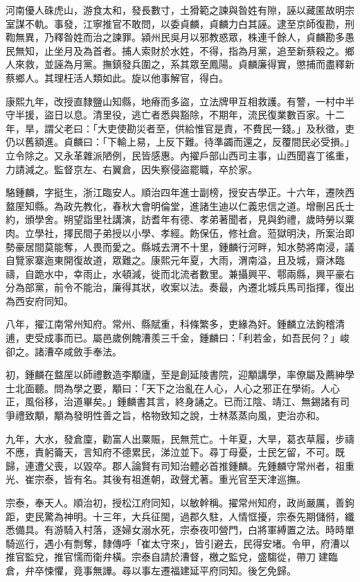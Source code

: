 \begin{pinyinscope}
河南優人硃虎山，游食太和，發長數寸，土猾範之諫與昝姓有隙，誣以藏匿故明宗室謀不軌。事發，江寧推官不敢問，以委貞麟，貞麟力白其誣。逮至京師復勘，刑鞫無異，乃釋昝姓而治之諫罪。潁州民吳月以邪教惑眾，株連千餘人，貞麟勘多愚民無知，止坐月及為首者。捕人索財於水姓，不得，指為月黨，追至新蔡殺之。鄉人來救，並誣為月黨。撫鎮發兵圍之，系其眾至鳳陽。貞麟廉得實，懲捕而盡釋新蔡鄉人。其理枉活人類如此。旋以他事解官，得白。

康熙九年，改授直隸鹽山知縣，地瘠而多盜，立法牌甲互相救護。有警，一村中半守半援，盜日以息。清里役，逃亡者悉與豁除，不期年，流民復業數百家。十二年，旱，謂父老曰：「大吏使勘災者至，供給惟官是責，不費民一錢。」及秋徵，吏仍以舊額進。貞麟曰：「下輸上易，上反下難。待準蠲而還之，反覆間民必受損。」立令除之。又永革雜派陋例，民皆感惠。內擢戶部山西司主事，山西聞喜丁徭重，力請減之。監督京左、右翼倉，因失察侵盜罷職，卒於家。

駱鍾麟，字挺生，浙江臨安人。順治四年進士副榜，授安吉學正。十六年，遷陜西盩厔知縣。為政先教化，春秋大會明倫堂，進諸生迪以仁義忠信之道。增刪呂氏士約，頒學舍。朔望詣里社講演，訪耆年有德、孝弟著聞者，見與鈞禮，歲時勞以粟肉。立學社，擇民間子弟授以小學、孝經。飭保伍，修社倉。蒞獄明決，所案治即勢豪居間莫能奪，人畏而愛之。縣城去渭不十里，鍾麟行河畔，知水勢將南浸，議自覽家寨迤東開復故道，眾難之。康熙元年夏，大雨，渭南溢，且及城，齋沐臨禱，自跪水中，幸雨止，水頓減，徙而北流者數里。兼攝興平、鄠兩縣，興平豪右分為部黨，前令不能治，廉得其狀，收案以法。奏最，內遷北城兵馬司指揮，復出為西安府同知。

八年，擢江南常州知府。常州、縣賦重，科條繁多，吏緣為奸。鍾麟立法鉤稽清逋，吏受成事而已。屬邑歲例餽漕羨三千金，鍾麟曰：「利若金，如吾民何？」峻卻之。諸漕卒咸斂手奉法。

初，鍾麟在盩厔以師禮數造李顒廬，至是創延陵書院，迎顒講學，率僚屬及薦紳學士北面聽。問為學之要，顒曰：「天下之治亂在人心，人心之邪正在學術。人心正，風俗移，治道畢矣。」鍾麟書其言，終身誦之。已而江陰、靖江、無錫諸有司爭禮致顒，顒為發明性善之旨，格物致知之說，士林蒸蒸向風，吏治亦和。

九年，大水，發倉廩，勸富人出粟賑，民無荒亡。十年夏，大旱，葛衣草履，步禱不應，責躬籥天，言知府不德累民，涕泣並下。尋丁母憂，士民乞留，不可。既歸，連遭父喪，以毀卒。郡人論賢有司知治體必首推鍾麟。先鍾麟守常州者，祖重光、崔宗泰，皆有名。其後有祖進朝，政聲尤著。重光官至天津巡撫。

宗泰，奉天人。順治初，授松江府同知，以敏幹稱。擢常州知府，政尚嚴厲，善鉤距，吏民驚為神明。十三年，大兵征閩，過郡久駐，人情恇擾，宗泰先期儲偫，纖悉備具。有游騎入村落，逐婦女溺水死，宗泰夜叩營門，白將軍縛置之法。時時單騎巡行，遇小有剽奪，隸傳呼「崔太守來」，皆引避去，民得安堵。令甲，府漕以推官監兌，推官懦而衛弁橫。宗泰自請於漕督，檄之監兌，盛騶從，帶刀建臨倉，弁卒悚懼，竟事無譁。尋以事左遷福建延平府同知。後乞免歸。


\end{pinyinscope}
